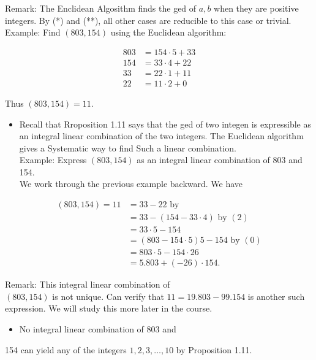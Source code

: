\documentclass[10pt]{article}
\begin{document}
Remark: The Enclidean Algosithm finds the ged of $a, b$ when they are positive integers. By (*) and (**), all other cases are reducible to this case or trivial.\\
Example: Find $(803,154)$ using the Euclidean algorithm:


\begin{align*}
803 & =154 \cdot 5+33  \tag{1}\\
154 & =33 \cdot 4+22  \tag{2}\\
33 & =22 \cdot 1+11  \tag{3}\\
22 & =11 \cdot 2+0 \tag{4}
\end{align*}


Thus $(803,154)=11$.

\begin{itemize}
  \item Recall that Rroposition 1.11 says that the ged of two integen is expressible as an integral linear combination of the two integers. The Euclidean algorithm gives a Systematic way to find Such a linear combination.\\
Example: Express $(803,154)$ as an integral linear combination of 803 and 154.\\
We work through the previous example backward. We have
\end{itemize}


\begin{align*}
(803,154)=11 & =33-22 \text { by } \\
& =33-(154-33 \cdot 4) \text { by }(2) \\
& =33 \cdot 5-154 \\
& =(803-154 \cdot 5) 5-154 \text { by }(0)  \tag{0}\\
& =803 \cdot 5-154 \cdot 26 \\
& =5.803+(-26) \cdot 154 \text {. }
\end{align*}


Remark: This integral linear combination of\\
$(803,154)$ is not unique. Can verify that $11=19.803-99.154$ is another such expression. We will study this more later in the course.

\begin{itemize}
  \item No integral linear combination of 803 and
\end{itemize}

154 can yield any of the integers $1,2,3, \ldots, 10$ by Proposition 1.11.
\end{document}
